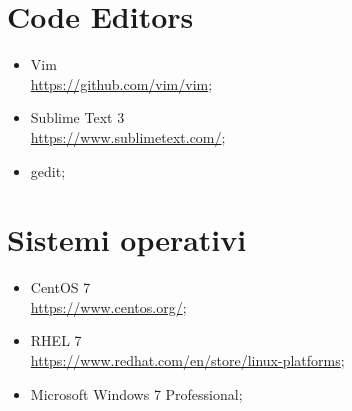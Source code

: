 \section{Code Editors}
\begin{itemize}
	\item Vim\\
	\href{https://github.com/vim/vim}{https://github.com/vim/vim};
	\item Sublime Text 3\\
	\href{https://www.sublimetext.com/}{https://www.sublimetext.com/};
	\item gedit;\\
\end{itemize}

\section{Sistemi operativi}
\begin{itemize}
	\item CentOS 7\\
	\href{https://www.centos.org/}{https://www.centos.org/};
	\item RHEL 7\\
	\href{https://www.redhat.com/en/store/linux-platforms}{https://www.redhat.com/en/store/linux-platforms};
	\item Microsoft Windows 7 Professional;\\
\end{itemize}